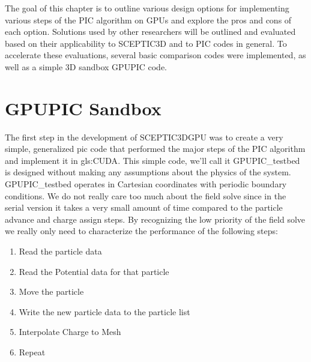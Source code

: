 The goal of this chapter is to outline various design options for implementing various steps of the PIC algorithm on GPUs and explore the pros and cons of each option. Solutions used by other researchers will be outlined and evaluated based on their applicability to SCEPTIC3D and to PIC codes in general. To accelerate these evaluations, several basic comparison codes were implemented, as well as a simple 3D sandbox GPUPIC code.



	\section{GPUPIC Sandbox}
The first step in the development of SCEPTIC3DGPU was to create a very simple, generalized pic code that performed the major steps of the PIC algorithm and implement it in \gls{gls:CUDA}. This simple code, we'll call it GPUPIC\_testbed is designed without making any assumptions about the physics of the system. GPUPIC\_testbed operates in Cartesian coordinates with periodic boundary conditions. We do not really care too much about the field solve since in the serial version it takes a very small amount of time compared to the particle advance and charge assign steps. By recognizing the low priority of the field solve we really only need to characterize the performance of the following steps:


\begin{enumerate}\itemsep0pt \parskip0pt 
\item Read the particle data
\item Read the Potential data for that particle
\item Move the particle
\item Write the new particle data to the particle list
\item Interpolate Charge to Mesh
\item Repeat
\end{enumerate}



